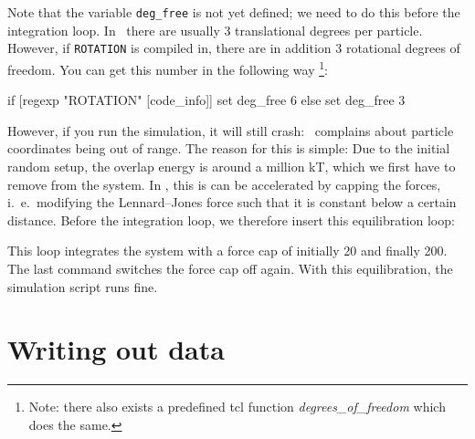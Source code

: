 \documentclass[
a4paper,                        %
11pt,                           %
twoside,                        %
footsepline,                    %
headsepline,                    %
headexclude,                    %
footexclude,                    %
pagesize,                       %
]{scrreprt}
\begin{document}
Note that the variable \verb|deg_free| is not yet defined; we need to
do this before the integration loop. In \es\ there are usually 3
translational  degrees per particle. However, if \verb|ROTATION| is
compiled in, there are in addition 3 rotational degrees of freedom.
You can get this number in the following way \footnote{Note: there
  also exists a predefined tcl function {\it degrees\_of\_freedom} which
  does the same.}:

\begin{tclcode}
  if { [regexp "ROTATION" [code_info]] } { set deg_free 6 } else { set
    deg_free 3 }
\end{tclcode}

However, if you run the simulation, it will still
crash: \es\ complains about particle coordinates being out of range.
The reason for this is simple: Due to the initial random setup, the
overlap energy is around a million kT, which we first have to remove
from the system. In \es, this is can be accelerated by capping the
forces, i.~e.\ modifying the Lennard--Jones force such that it is
constant below a certain distance. Before the integration loop, we
therefore insert this equilibration loop:
This loop integrates the system with a force cap of initially 20 and
finally 200.  The last command switches the force cap off again. With
this equilibration, the simulation script runs fine.

\section{Writing out data}
\end{document}
